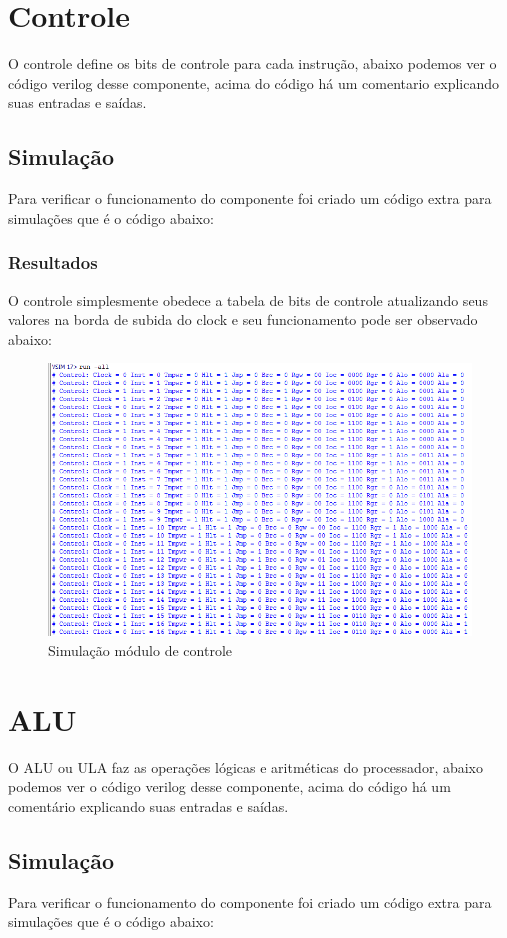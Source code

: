 \documentclass[a4paper, 10pt]{article}
\begin{document}
\section{Controle}
O controle define os bits de controle para cada instrução, abaixo podemos ver o código verilog desse componente, acima do código há um comentario explicando suas entradas e saídas.

\subsection{Simulação}
Para verificar o funcionamento do componente foi criado um código extra para simulações que é o código abaixo:

\subsubsection{Resultados}
O controle simplesmente obedece a tabela de bits de controle atualizando seus valores na borda de subida do clock e seu funcionamento pode ser observado abaixo:
\begin{figure}[H]
	\centering
	\includegraphics[scale=0.7]{simuCTRL.PNG}
	\caption{Simulação módulo de controle}
	\label{Rotulo}
\end{figure}

\section{ALU}
O ALU ou ULA faz as operações lógicas e aritméticas do processador, abaixo podemos ver o código verilog desse componente, acima do código há um comentário explicando suas entradas e saídas.

\subsection{Simulação}
Para verificar o funcionamento do componente foi criado um código extra para simulações que é o código abaixo:

\end{document}
